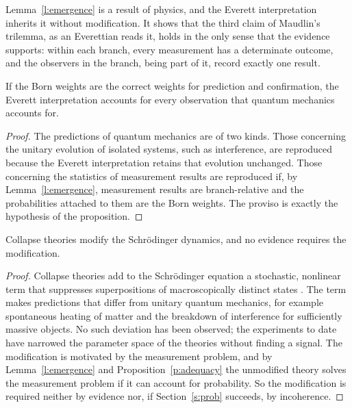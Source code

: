 \documentclass{situationist-preprint}
\begin{document}
Lemma~\ref{l:emergence} is a result of physics, and the Everett interpretation inherits it without modification. It shows that the third claim of Maudlin's trilemma, as an Everettian reads it, holds in the only sense that the evidence supports: within each branch, every measurement has a determinate outcome, and the observers in the branch, being part of it, record exactly one result.

\begin{proposition}[Adequacy]\label{p:adequacy}
If the Born weights are the correct weights for prediction and confirmation, the Everett interpretation accounts for every observation that quantum mechanics accounts for.
\end{proposition}

\begin{proof}
The predictions of quantum mechanics are of two kinds. Those concerning the unitary evolution of isolated systems, such as interference, are reproduced because the Everett interpretation retains that evolution unchanged. Those concerning the statistics of measurement results are reproduced if, by Lemma~\ref{l:emergence}, measurement results are branch-relative and the probabilities attached to them are the Born weights. The proviso is exactly the hypothesis of the proposition.
\end{proof}

\begin{lemma}\label{l:collapse}
Collapse theories modify the Schrödinger dynamics, and no evidence requires the modification.
\end{lemma}

\begin{proof}
Collapse theories add to the Schrödinger equation a stochastic, nonlinear term that suppresses superpositions of macroscopically distinct states \citep{GRW1986}. The term makes predictions that differ from unitary quantum mechanics, for example spontaneous heating of matter and the breakdown of interference for sufficiently massive objects. No such deviation has been observed; the experiments to date have narrowed the parameter space of the theories without finding a signal. The modification is motivated by the measurement problem, and by Lemma~\ref{l:emergence} and Proposition~\ref{p:adequacy} the unmodified theory solves the measurement problem if it can account for probability. So the modification is required neither by evidence nor, if Section~\ref{s:prob} succeeds, by incoherence.
\end{proof}
\end{document}
